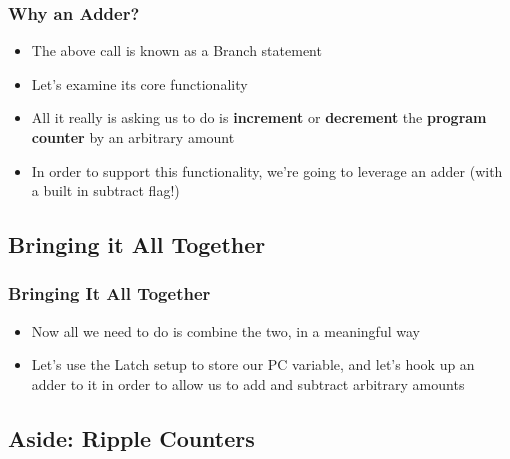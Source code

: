 \documentclass{beamer}
\begin{document}
		
		\begin{frame}
			\frametitle{Why an Adder?}
			
			{
			\centering
			



			}
			
			\begin{itemize}
				\item The above call is known as a Branch statement
				\item Let's examine its core functionality
				\item All it really is asking us to do is \textbf{increment} or \textbf{decrement} the \textbf{program counter} by an arbitrary amount
				\item In order to support this functionality, we're going to leverage an adder (with a built in subtract flag!)
			\end{itemize}
		\end{frame}
		
		\subsection{Bringing it All Together}
		
		\begin{frame}
			\frametitle{Bringing It All Together}
			\begin{itemize}
			
				\item Now all we need to do is combine the two, in a meaningful way
				\item Let's use the Latch setup to store our PC variable, and let's hook up an adder to it in order to allow us to add and subtract arbitrary amounts
			\end{itemize}
		\end{frame}
		
		\subsection{Aside: Ripple Counters}
	
\end{document}
